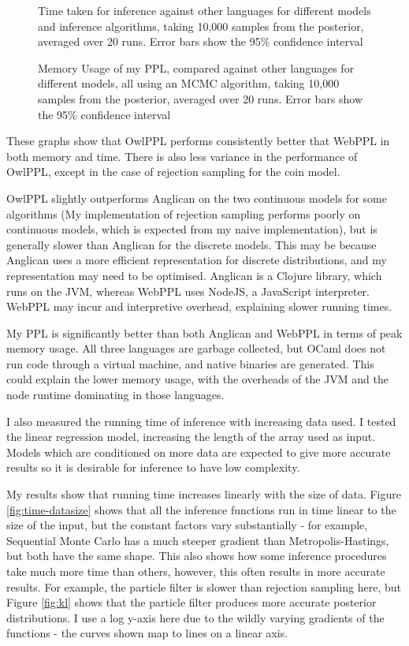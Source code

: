 \begin{figure}[!ht]
	\centering
	
	\caption{Time taken for inference against other languages for different models and inference algorithms, taking 10,000 samples from the posterior, averaged over 20 runs. Error bars show the 95\% confidence interval}
	\label{fig:time-perf}
\end{figure}
						
\begin{figure}[!ht]
	\centering
	
	\caption{Memory Usage of my PPL, compared against other languages for different models, all using an MCMC algorithm, taking 10,000 samples from the posterior, averaged over 20 runs. Error bars show the 95\% confidence interval}
	\label{fig:mem-perf}
\end{figure}
						
These graphs show that OwlPPL performs consistently better that WebPPL in both memory and time. There is also less variance in the performance of OwlPPL, except in the case of rejection sampling for the coin model.

OwlPPL slightly outperforms Anglican on the two continuous models for some algorithms (My implementation of rejection sampling performs poorly on continuous models, which is expected from my naive implementation), but is generally slower than Anglican for the discrete models. This may be because Anglican uses a more efficient representation for discrete distributions, and my representation may need to be optimised. Anglican is a Clojure library, which runs on the JVM, whereas WebPPL uses NodeJS, a JavaScript interpreter.  WebPPL may incur and interpretive overhead, explaining slower running times. 

My PPL is significantly better than both Anglican and WebPPL in terms of peak memory usage. All three languages are garbage collected, but OCaml does not run code through a virtual machine, and native binaries are generated. This could explain the lower memory usage, with the overheads of the JVM and the node runtime dominating in those languages.

I also measured the running time of inference with increasing data used. I tested the linear regression model, increasing the length of the array used as input. Models which are conditioned on more data are expected to give more accurate results so it is desirable for inference to have low complexity. 

My results show that running time increases linearly with the size of data. Figure \ref{fig:time-datasize} shows that all the inference functions run in time linear to the size of the input, but the constant factors vary substantially - for example, Sequential Monte Carlo has a much steeper gradient than Metropolis-Hastings, but both have the same shape. This also shows how some inference procedures take much more time than others, however, this often results in more accurate results. For example, the particle filter is slower than rejection sampling here, but Figure \ref{fig:kl} shows that the particle filter produces more accurate posterior distributions. I use a log y-axis here due to the wildly varying gradients of the functions - the curves shown map to lines on a linear axis.

